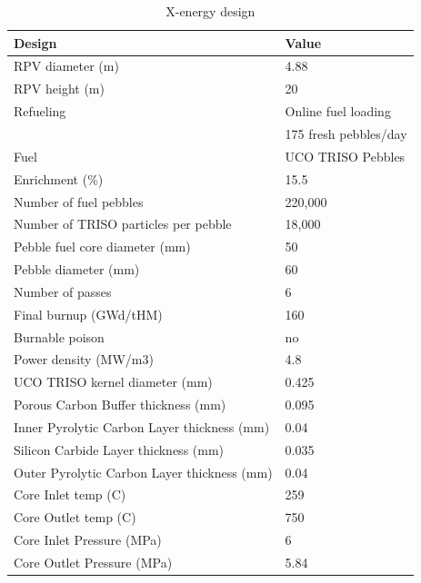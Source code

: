 \begin{table} [ht]
\begin{center}

\caption{ X-energy design}
\label{xtable}
\begin{tabular}{l l}
\hline 
Design 		&Value \\ 
\hline 
RPV diameter (m) 		&4.88 \\ 
RPV height (m) 		&20 \\ 
Refueling		&Online fuel loading  \\ 
	&175 fresh pebbles/day \\ 
Fuel		&UCO TRISO Pebbles \\ 
Enrichment (\%)		&15.5 \\ 
Number of fuel pebbles		&220,000 \\ 
Number of TRISO particles per pebble		&18,000 \\ 
Pebble fuel core diameter (mm)		&50 \\ 
Pebble diameter (mm)	&60 \\ 
Number of passes		&6\\ 
Final burnup (GWd/tHM)		&160 \\ 
Burnable poison		&no \\ 
Power density (MW/m3)		&4.8 \\ 
UCO TRISO kernel diameter (mm)	&0.425 \\ 
Porous Carbon Buffer thickness (mm)	&0.095 \\ 
Inner Pyrolytic Carbon Layer thickness (mm) 	&0.04 \\ 
Silicon Carbide Layer thickness (mm)	&0.035 \\ 
Outer Pyrolytic Carbon Layer thickness (mm)	&0.04 \\ 
Core Inlet temp (C)	&259 \\ 
Core Outlet temp (C) 	&750 \\ 
Core Inlet Pressure (MPa)	&6 \\ 
Core Outlet Pressure (MPa)	&5.84 \\ 
\hline 

\end{tabular}
\end{center}
\end{table}

